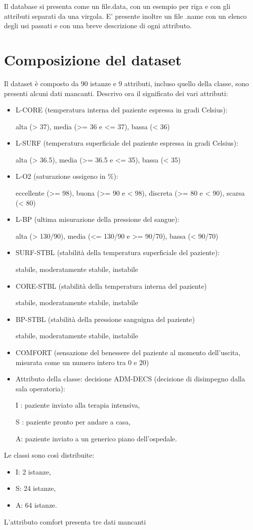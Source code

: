 \documentclass[a4paper, 12p]{report}
\begin{document}
Il database si presenta come un file.data, con un esempio per riga e con gli attributi  separati da una virgola. E' presente inoltre un file .name con un elenco degli usi passati e con una breve descrizione di ogni attributo.

\section{Composizione del dataset}
Il dataset è composto da 90 istanze e 9 attributi, incluso quello della classe, sono presenti alcuni dati mancanti.
Descrivo ora il significato dei vari attributi:
\begin{itemize}

	\item L-CORE (temperatura interna del paziente espressa in gradi Celsius):
	
              alta (> 37), media (>= 36 e <= 37), bassa (< 36)
	\item L-SURF (temperatura superficiale del paziente espressa in gradi Celsius):
	
              alta (> 36.5), media (>= 36.5 e <= 35), bassa (< 35)
	\item L-O2 (saturazione ossigeno in \%):
	
              eccellente (>= 98), buona (>= 90 e < 98), discreta (>= 80 e < 90), scarsa (< 80)
	\item L-BP (ultima misurazione della pressione del sangue):
	
              alta (> 130/90), media (<= 130/90 e >= 90/70), bassa (< 90/70)
	\item SURF-STBL (stabilità della temperatura superficiale del paziente):
	
              stabile, moderatamente stabile, instabile
	\item CORE-STBL (stabilità della temperatura interna del paziente)
	
              stabile, moderatamente stabile, instabile
	\item  BP-STBL (stabilità della pressione sanguigna del paziente)
	
             stabile, moderatamente stabile, instabile
	\item COMFORT (sensazione del benessere del paziente al momento dell'uscita, misurata come un numero intero tra 0 e 20)
	\item Attributo della classe: decisione ADM-DECS (decisione di disimpegno dalla sala operatoria):
	
              I : paziente inviato alla terapia intensiva,
							
              S : paziente pronto per andare a casa,
							
              A: paziente inviato a un generico piano dell'ospedale.
														
\end{itemize}
Le classi sono così distribuite:
\begin{itemize}
\item I: 2 istanze,
\item S: 24 istanze,
\item A: 64 istanze.
\end{itemize}
L'attributo comfort presenta tre dati mancanti
\end{document}
